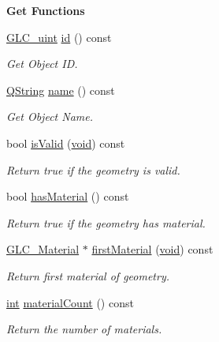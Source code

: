 \begin{Indent}{\bf Get Functions}\par
\begin{DoxyCompactItemize}
\item 
\hyperlink{glc__global_8h_abf950976fabed69026558df8e2da6c6b}{G\-L\-C\-\_\-uint} \hyperlink{class_g_l_c___geometry_ad9cfdbadda13935ec698187f74a22e27}{id} () const 
\begin{DoxyCompactList}\small\item\em Get Object I\-D. \end{DoxyCompactList}\item 
\hyperlink{group___u_a_v_objects_plugin_gab9d252f49c333c94a72f97ce3105a32d}{Q\-String} \hyperlink{class_g_l_c___geometry_a16c70f7ed61bce6fbc4cbbaa9419b2de}{name} () const 
\begin{DoxyCompactList}\small\item\em Get Object Name. \end{DoxyCompactList}\item 
bool \hyperlink{class_g_l_c___geometry_ade884ae68aed930470e80161d903cfa7}{is\-Valid} (\hyperlink{group___u_a_v_objects_plugin_ga444cf2ff3f0ecbe028adce838d373f5c}{void}) const 
\begin{DoxyCompactList}\small\item\em Return true if the geometry is valid. \end{DoxyCompactList}\item 
bool \hyperlink{class_g_l_c___geometry_a09589f76838e44bc63bbcdde70ee73a8}{has\-Material} () const 
\begin{DoxyCompactList}\small\item\em Return true if the geometry has material. \end{DoxyCompactList}\item 
\hyperlink{class_g_l_c___material}{G\-L\-C\-\_\-\-Material} $\ast$ \hyperlink{class_g_l_c___geometry_aabfde83bd23e0a6ce5fa6681c2203f64}{first\-Material} (\hyperlink{group___u_a_v_objects_plugin_ga444cf2ff3f0ecbe028adce838d373f5c}{void}) const 
\begin{DoxyCompactList}\small\item\em Return first material of geometry. \end{DoxyCompactList}\item 
\hyperlink{ioapi_8h_a787fa3cf048117ba7123753c1e74fcd6}{int} \hyperlink{class_g_l_c___geometry_a9d2b0a29e48aac8acbfd1975e3cd7210}{material\-Count} () const 
\begin{DoxyCompactList}\small\item\em Return the number of materials. \end{DoxyCompactList}\item 

\end{DoxyCompactItemize}
\end{Indent}
